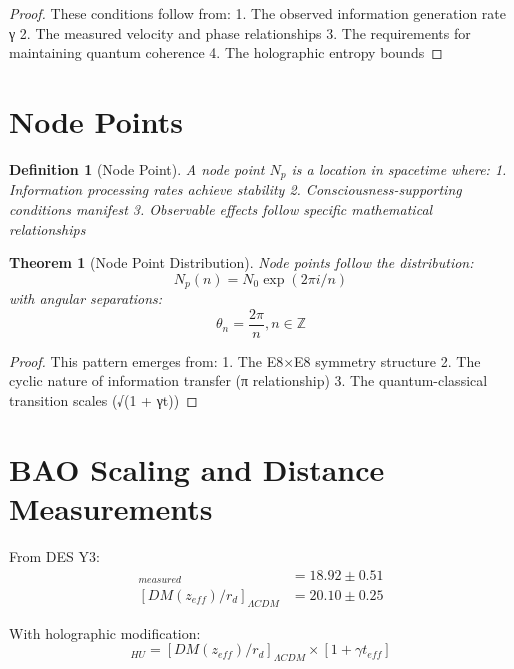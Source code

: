 \documentclass{article}
\newtheorem{theorem}{Theorem}
\newtheorem{definition}{Definition}
\begin{document}
\begin{proof}
These conditions follow from:
1. The observed information generation rate γ
2. The measured velocity and phase relationships
3. The requirements for maintaining quantum coherence
4. The holographic entropy bounds
\end{proof}

\section{Node Points}

\begin{definition}[Node Point]
A node point $N_p$ is a location in spacetime where:
1. Information processing rates achieve stability
2. Consciousness-supporting conditions manifest
3. Observable effects follow specific mathematical relationships
\end{definition}

\begin{theorem}[Node Point Distribution]
Node points follow the distribution:
\begin{equation}
N_p(n) = N_0\exp(2\pi i/n)
\end{equation}
with angular separations:
\begin{equation}
\theta_n = \frac{2\pi}{n}, n \in \mathbb{Z}
\end{equation}
\end{theorem}

\begin{proof}
This pattern emerges from:
1. The E8×E8 symmetry structure
2. The cyclic nature of information transfer (π relationship)
3. The quantum-classical transition scales (√(1 + γt))
\end{proof}

\section{BAO Scaling and Distance Measurements}

From DES Y3:
\begin{align}
[DM(z_{eff})/r_d]_{measured} &= 18.92 \pm 0.51 \\
[DM(z_{eff})/r_d]_{\Lambda CDM} &= 20.10 \pm 0.25
\end{align}

With holographic modification:
\begin{equation}
[DM(z_{eff})/r_d]_{HU} = [DM(z_{eff})/r_d]_{\Lambda CDM} \times [1 + \gamma t_{eff}]
\end{equation}
\end{document}
